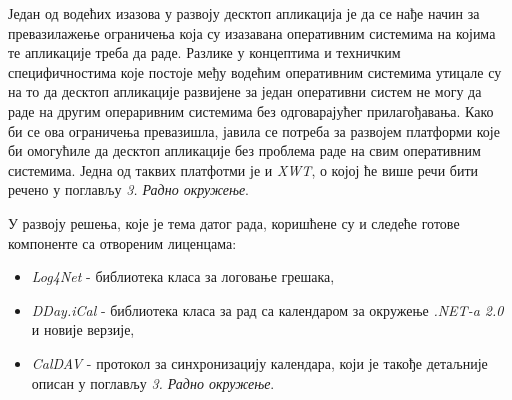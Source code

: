 Један од водећих изазова у развоју десктоп апликација је да се нађе начин за превазилажење ограничења која су изазавана оперативним системима на којима те апликације треба да раде. Разлике у концептима и техничким специфичностима које постоје међу водећим оперативним системима утицале су на то да десктоп апликације развијене за један оперативни систем не могу да раде на другим операривним системима без одговарајућег прилагођавања. Како би се ова ограничења превазишла, јавила се потреба за развојем платформи које би омогућиле да десктоп апликације без проблема раде на свим оперативним системима. Једна од таквих платфотми је и \textit{XWT}\cite{xwt}, о којој ће више речи бити речено у поглављу \textit{3. Радно окружење}.

У развоју решења, које је тема датог рада, коришћене су и следеће готове компоненте са отвореним лиценцама:
\begin{itemize}
	\item {\textit{Log4Net} - библиотека класа за логовање грешака},
	\item {\textit{DDay.iCal}\cite{dday} - библиотека класа за рад са календаром за окружење \textit{.NET-a 2.0} и новије верзије},
	\item {\textit{CalDAV}\cite{caldav} - протокол за синхронизацију календара, који је такође детаљније описан у поглављу \textit{3. Радно окружење}}.
\end{itemize}